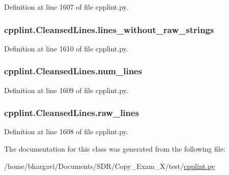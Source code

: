Definition at line 1607 of file cpplint.\+py.

\subsubsection[{\texorpdfstring{lines\+\_\+without\+\_\+raw\+\_\+strings}{lines_without_raw_strings}}]{\setlength{\rightskip}{0pt plus 5cm}cpplint.\+Cleansed\+Lines.\+lines\+\_\+without\+\_\+raw\+\_\+strings}\hypertarget{classcpplint_1_1_cleansed_lines_a0cc228ba3c00ba590b27a759cf8023ce}{}\label{classcpplint_1_1_cleansed_lines_a0cc228ba3c00ba590b27a759cf8023ce}


Definition at line 1610 of file cpplint.\+py.

\subsubsection[{\texorpdfstring{num\+\_\+lines}{num_lines}}]{\setlength{\rightskip}{0pt plus 5cm}cpplint.\+Cleansed\+Lines.\+num\+\_\+lines}\hypertarget{classcpplint_1_1_cleansed_lines_a4b42ab48659954fb6e0a4e4eb483a45a}{}\label{classcpplint_1_1_cleansed_lines_a4b42ab48659954fb6e0a4e4eb483a45a}


Definition at line 1609 of file cpplint.\+py.

\subsubsection[{\texorpdfstring{raw\+\_\+lines}{raw_lines}}]{\setlength{\rightskip}{0pt plus 5cm}cpplint.\+Cleansed\+Lines.\+raw\+\_\+lines}\hypertarget{classcpplint_1_1_cleansed_lines_a9e94ce9e4f682be33c04fe82429c4dfd}{}\label{classcpplint_1_1_cleansed_lines_a9e94ce9e4f682be33c04fe82429c4dfd}


Definition at line 1608 of file cpplint.\+py.



The documentation for this class was generated from the following file\+:\begin{DoxyCompactItemize}
\item 
/home/bhargavi/\+Documents/\+S\+D\+R/\+Copy\+\_\+\+Exam\+\_\+X/test/\hyperlink{cpplint_8py}{cpplint.\+py}\end{DoxyCompactItemize}

